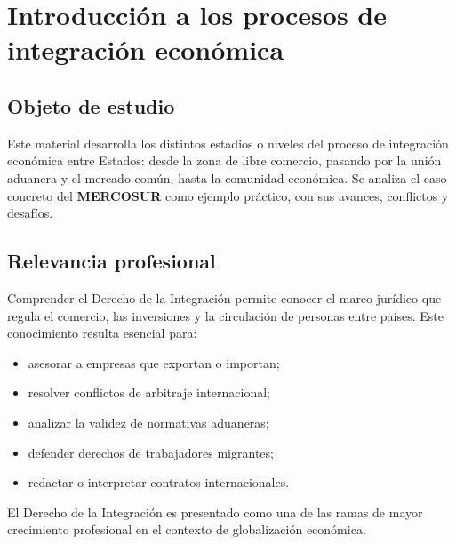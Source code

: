 \documentclass[12pt,oneside]{book}
\begin{document}
\tableofcontents
\clearpage


\chapter[Introducción a los procesos de integración]{Introducción a los procesos de integración económica}

\section{Objeto de estudio}

Este material desarrolla los distintos estadios o niveles del proceso de integración económica entre Estados: desde la zona de libre comercio, pasando por la unión aduanera y el mercado común, hasta la comunidad económica. Se analiza el caso concreto del \textbf{MERCOSUR} como ejemplo práctico, con sus avances, conflictos y desafíos.

\section{Relevancia profesional}

Comprender el Derecho de la Integración permite conocer el marco jurídico que regula el comercio, las inversiones y la circulación de personas entre países. Este conocimiento resulta esencial para:

\begin{itemize}
    \item asesorar a empresas que exportan o importan;
    \item resolver conflictos de arbitraje internacional;
    \item analizar la validez de normativas aduaneras;
    \item defender derechos de trabajadores migrantes;
    \item redactar o interpretar contratos internacionales.
\end{itemize}

El Derecho de la Integración es presentado como una de las ramas de mayor crecimiento profesional en el contexto de globalización económica.
\end{document}
